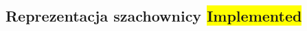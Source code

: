 \subsection{Reprezentacja szachownicy \colorbox{yellow}{Implemented}}
\label{subsec:reprezentacja-szachownicy}
